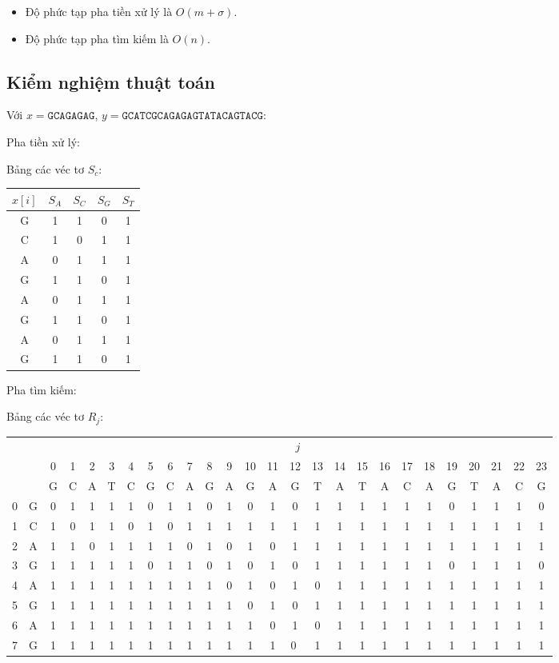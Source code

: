 \documentclass[12pt,twoside,openright]{extreport}
\begin{document}
\begin{itemize}
	\item Độ phức tạp pha tiền xử lý là $O(m + \sigma)$.
	\item Độ phức tạp pha tìm kiếm là $O(n)$.
\end{itemize}

\subsection{Kiểm nghiệm thuật toán}

Với $x = \texttt{GCAGAGAG}$, $y = \texttt{GCATCGCAGAGAGTATACAGTACG}$:

Pha tiền xử lý:

Bảng các véc tơ $S_c$:

\begin{center}
\begin{tabular}{|c|cccc|}
\hline
$x[i]$ & $S_A$ & $S_C$ & $S_G$ & $S_T$ \\
\hline
G & 1 & 1 & 0 & 1 \\
C & 1 & 0 & 1 & 1 \\
A & 0 & 1 & 1 & 1 \\
G & 1 & 1 & 0 & 1 \\
A & 0 & 1 & 1 & 1 \\
G & 1 & 1 & 0 & 1 \\
A & 0 & 1 & 1 & 1 \\
G & 1 & 1 & 0 & 1 \\
\hline
\end{tabular}
\end{center}

Pha tìm kiếm:

Bảng các véc tơ $R_j$:

\begin{center}
\setlength{\tabcolsep}{4pt}
\begin{tabular}{c|c|*{24}{c}}
\multicolumn{2}{c|}{} & \multicolumn{24}{c}{$j$} \\
\multicolumn{2}{c|}{} &
0 & 1 & 2 & 3 & 4 & 5 & 6 & 7 & 8 & 9 & 10 & 11 & 12 & 13 & 14 & 15 & 16 & 17 & 18 & 19 & 20 & 21 & 22 & 23 \\
\multicolumn{2}{c|}{} &
G & C & A & T & C & G & C & A & G & A & G  & A  & G  & T  & A  & T  & A  & C  & A  & G  & T  & A  & C  & G  \\
\hline
0 & G & 0&1&1&1&1&0&1&1&0&1&0&1&0&1&1&1&1&1&1&0&1&1&1&0 \\
1 & C & 1&0&1&1&0&1&0&1&1&1&1&1&1&1&1&1&1&1&1&1&1&1&1&1 \\
2 & A & 1&1&0&1&1&1&1&0&1&0&1&0&1&1&1&1&1&1&1&1&1&1&1&1 \\
3 & G & 1&1&1&1&1&0&1&1&0&1&0&1&0&1&1&1&1&1&1&0&1&1&1&0 \\
4 & A & 1&1&1&1&1&1&1&1&1&0&1&0&1&0&1&1&1&1&1&1&1&1&1&1 \\
5 & G & 1&1&1&1&1&1&1&1&1&1&0&1&0&1&1&1&1&1&1&1&1&1&1&1 \\
6 & A & 1&1&1&1&1&1&1&1&1&1&1&0&1&0&1&1&1&1&1&1&1&1&1&1 \\
7 & G & 1&1&1&1&1&1&1&1&1&1&1&1&\textcircled{\footnotesize 0}&1&1&1&1&1&1&1&1&1&1&1 \\
\end{tabular}
\end{center}
\end{document}

